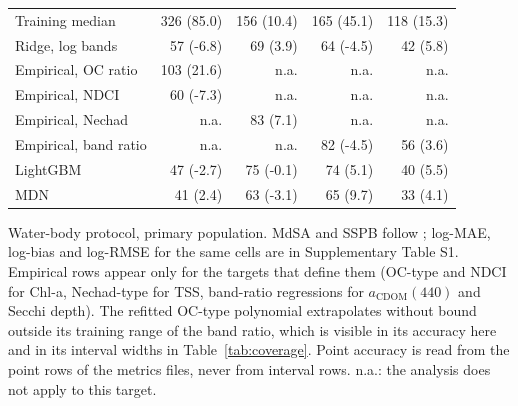 \begin{table}[!tp]
\begin{tabular}{@{}lrrrr@{}}
\quad Training median & 326 (85.0) & 156 (10.4) & 165 (45.1) & 118 (15.3) \\
\quad Ridge, log bands & 57 (-6.8) & 69 (3.9) & 64 (-4.5) & 42 (5.8) \\
\quad Empirical, OC ratio & 103 (21.6) & n.a. & n.a. & n.a. \\
\quad Empirical, NDCI & 60 (-7.3) & n.a. & n.a. & n.a. \\
\quad Empirical, Nechad & n.a. & 83 (7.1) & n.a. & n.a. \\
\quad Empirical, band ratio & n.a. & n.a. & 82 (-4.5) & 56 (3.6) \\
\quad LightGBM & 47 (-2.7) & 75 (-0.1) & 74 (5.1) & 40 (5.5) \\
\quad MDN & 41 (2.4) & 63 (-3.1) & 65 (9.7) & 33 (4.1) \\
\bottomrule
\end{tabular}
\par\smallskip\raggedright\footnotesize Water-body protocol, primary population. MdSA and SSPB follow \citet{Morley2018}; log-MAE, log-bias and log-RMSE for the same cells are in Supplementary Table S1. Empirical rows appear only for the targets that define them (OC-type and NDCI for Chl-a, Nechad-type for TSS, band-ratio regressions for $a_\mathrm{CDOM}(440)$ and Secchi depth). The refitted OC-type polynomial extrapolates without bound outside its training range of the band ratio, which is visible in its accuracy here and in its interval widths in Table~\ref{tab:coverage}. Point accuracy is read from the point rows of the metrics files, never from interval rows. n.a.: the analysis does not apply to this target. 
\end{table}
